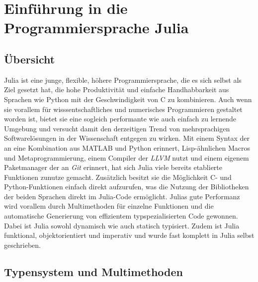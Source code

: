 \documentclass[proseminar,german,utf8]{zihpub}
\begin{document}
\section{Einführung in die Programmiersprache Julia}

\subsection{Übersicht}

Julia ist eine junge, flexible, höhere Programmiersprache, die es sich selbst als Ziel gesetzt hat, die hohe Produktivität und einfache Handhabbarkeit aus Sprachen wie Python mit der Geschwindigkeit von C zu kombinieren. Auch wenn sie vorallem für wisssentschaftliches und numerisches Programmieren gestaltet worden ist, bietet sie eine sogleich performante wie auch einfach zu lernende Umgebung und versucht damit den derzeitigen Trend von mehrsprachigen Softwarelösungen in der Wissenschaft entgegen zu wirken. Mit einem Syntax der an eine Kombination aus MATLAB und Python erinnert, Lisp-ähnlichen Macros und Metaprogrammierung, einem Compiler der \textit{LLVM} nutzt und einem eigenem Paketmanager der an \textit{Git} erinnert, hat sich Julia viele bereits etablierte Funktionen zunutze gemacht. Zusätzlich besitzt sie die Möglichkeit C- und Python-Funktionen einfach direkt aufzurufen, was die Nutzung der Bibliotheken der beiden Sprachen direkt im Julia-Code ermöglicht. Julias gute Performanz wird vorallem durch Multimethoden für einzelne Funktionen und die automatische Generierung von effizientem typspezialisierten Code gewonnen. Dabei ist Julia sowohl dynamisch wie auch statisch typisiert. Zudem ist Julia funktional, objektorientiert und imperativ und wurde fast komplett in Julia selbst geschrieben.

\subsection{Typensystem und Multimethoden}
\end{document}
